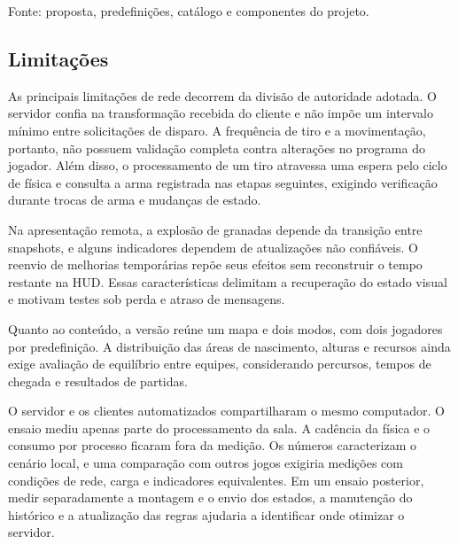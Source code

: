 Fonte: proposta, predefinições, catálogo e componentes do projeto.

\subsection{Limitações}\label{sec:5.3.4}

As principais limitações de rede decorrem da divisão de autoridade adotada. O servidor confia na transformação recebida do cliente e não impõe um intervalo mínimo entre solicitações de disparo. A frequência de tiro e a movimentação, portanto, não possuem validação completa contra alterações no programa do jogador. Além disso, o processamento de um tiro atravessa uma espera pelo ciclo de física e consulta a arma registrada nas etapas seguintes, exigindo verificação durante trocas de arma e mudanças de estado.

Na apresentação remota, a explosão de granadas depende da transição entre snapshots, e alguns indicadores dependem de atualizações não confiáveis. O reenvio de melhorias temporárias repõe seus efeitos sem reconstruir o tempo restante na HUD. Essas características delimitam a recuperação do estado visual e motivam testes sob perda e atraso de mensagens.

Quanto ao conteúdo, a versão reúne um mapa e dois modos, com dois jogadores por predefinição. A distribuição das áreas de nascimento, alturas e recursos ainda exige avaliação de equilíbrio entre equipes, considerando percursos, tempos de chegada e resultados de partidas.

O servidor e os clientes automatizados compartilharam o mesmo computador. O ensaio mediu apenas parte do processamento da sala. A cadência da física e o consumo por processo ficaram fora da medição. Os números caracterizam o cenário local, e uma comparação com outros jogos exigiria medições com condições de rede, carga e indicadores equivalentes. Em um ensaio posterior, medir separadamente a montagem e o envio dos estados, a manutenção do histórico e a atualização das regras ajudaria a identificar onde otimizar o servidor.
